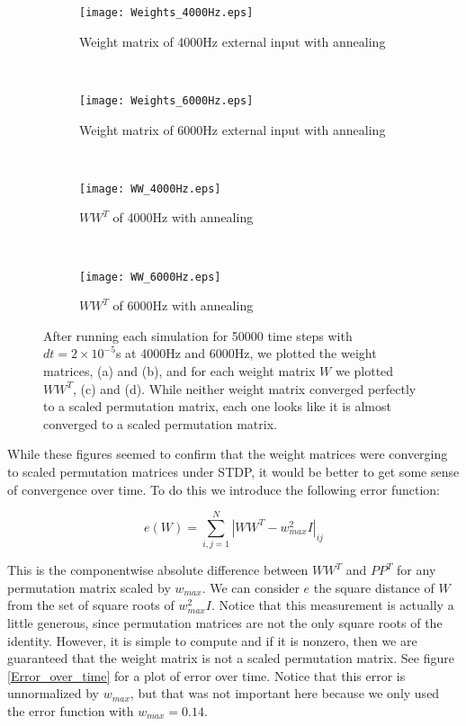\begin{figure}[H]
\centering
\begin{subfigure}[b]{0.49\textwidth}
\texttt{[image: Weights\_4000Hz.eps]}
\caption{Weight matrix of 4000Hz external input with annealing}
\label{Weights: 4000Hz, basic}
\end{subfigure}
\,
\begin{subfigure}[b]{0.49\textwidth}
\texttt{[image: Weights\_6000Hz.eps]}
\caption{Weight matrix of 6000Hz external input with annealing}
\label{Weights: 6000Hz, basic}
\end{subfigure}
\\
\begin{subfigure}[b]{0.49\textwidth}
\texttt{[image: WW\_4000Hz.eps]}
\caption{\(WW^T\) of 4000Hz with annealing}
\label{Weights: 4000Hz, product}
\end{subfigure}
\,
\begin{subfigure}[b]{0.49\textwidth}
\texttt{[image: WW\_6000Hz.eps]}
\caption{\(WW^T\) of 6000Hz with annealing}
\label{Weights: 6000Hz, product}
\end{subfigure}
\caption{After running each simulation for 50000 time steps with \(dt = 2\times 10^{-5}\)s at 4000Hz and 6000Hz, we plotted the weight matrices, (a) and (b), and for each weight matrix \(W\) we plotted \(WW^T\), (c) and (d). While neither weight matrix converged perfectly to a scaled permutation matrix, each one looks like it is almost converged to a scaled permutation matrix.}
\label{Weights}
\end{figure}

While these figures seemed to confirm that the weight matrices were converging to scaled permutation matrices under STDP, it would be better to get some sense of convergence over time. To do this we introduce the following error function:

\[e(W) = \sum_{i,j=1}^N \left|WW^T - w_{max}^2I\right|_{ij}\]

This is the componentwise absolute difference between \(WW^T\) and \(PP^T\) for any permutation matrix scaled by \(w_{max}\). We can consider \(e\) the square distance of \(W\) from the set of square roots of \(w^2_{max}I\). Notice that this measurement is actually a little generous, since permutation matrices are not the only square roots of the identity. However, it is simple to compute and if it is nonzero, then we are guaranteed that the weight matrix is not a scaled permutation matrix. See figure \ref{Error_over_time} for a plot of error over time. Notice that this error is unnormalized by \(w_{max}\), but that was not important here because we only used the error function with \(w_{max} = 0.14\).

